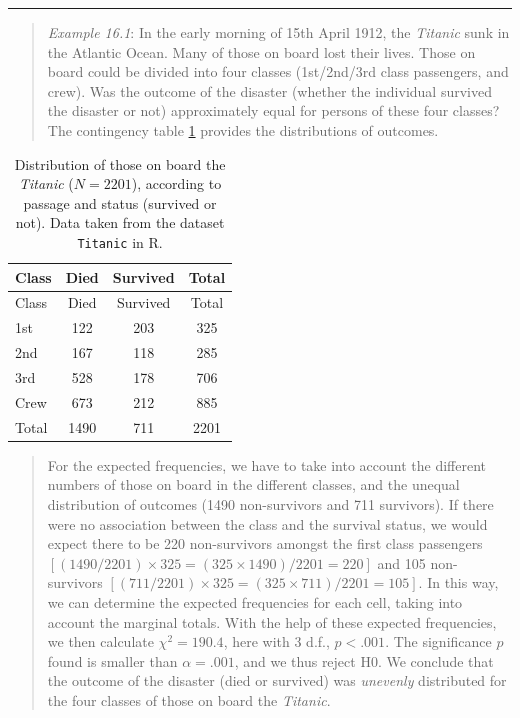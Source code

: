 \documentclass[
]{book}
\begin{document}
\begin{center}\rule{0.5\linewidth}{0.5pt}\end{center}

\begin{quote}
\emph{Example 16.1}: In the early morning of 15th April 1912, the \emph{Titanic}
sunk in the Atlantic Ocean. Many of those on board lost their lives.
Those on board could be divided into four classes (1st/2nd/3rd class passengers, and crew). Was the outcome of the disaster (whether the individual survived the
disaster or not) approximately equal for persons of these four classes?
The contingency table \ref{tab:titanic} provides the distributions of
outcomes.
\end{quote}

\begin{longtable}[]{@{}lccc@{}}
\caption{\label{tab:titanic} Distribution of those on board the \emph{Titanic} (\(N=2201\)),
according to passage
and status (survived or not). Data taken from the dataset
\texttt{Titanic} in R.}\tabularnewline
\toprule\noalign{}
Class & Died & Survived & Total \\
\midrule\noalign{}
\endfirsthead
\toprule\noalign{}
Class & Died & Survived & Total \\
\midrule\noalign{}
\endhead
\bottomrule\noalign{}
\endlastfoot
1st & 122 & 203 & 325 \\
2nd & 167 & 118 & 285 \\
3rd & 528 & 178 & 706 \\
Crew & 673 & 212 & 885 \\
Total & 1490 & 711 & 2201 \\
\end{longtable}

\begin{quote}
For the expected frequencies, we have to take into account
the different numbers of those on board in the different classes,
and the unequal distribution of outcomes (1490 non-survivors and 711
survivors). If there were no association between the class and the survival
status, we would expect there to be 220 non-survivors amongst the first class
passengers \([(1490/2201) \times 325 = (325 \times 1490) / 2201 = 220]\)
and 105 non-survivors \([(711/2201) \times 325 = (325 \times 711) / 2201 =
105]\). In this way, we can determine the expected frequencies for each cell,
taking into account the marginal totals. With the help of these
expected frequencies, we then calculate \(\chi^2=190.4\), here with 3 d.f.,
\(p<.001\). The significance \(p\) found is smaller than \(\alpha=.001\), and
we thus reject H0. We conclude that the outcome of the disaster (died or survived)
was \emph{unevenly} distributed for the four classes of those on board the \emph{Titanic}.
\end{quote}
\end{document}
